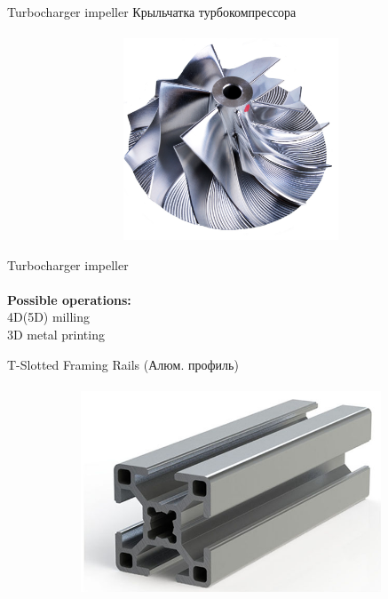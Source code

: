 \documentclass[aspectratio=169]{beamer}
\begin{document}
\begin{frame}[c]{Turbocharger impeller Крыльчатка турбокомпрессора}
\framesubtitle{}
    \vspace{-0.6cm}
    \begin{figure}[H]
        \centering\includegraphics[height=6cm,width=1\textwidth,keepaspectratio]{tourbin.png}
        \label{fig:tourbin.png}
    \end{figure}
\end{frame} 

\begin{frame}[c]{Turbocharger impeller}
    \framesubtitle{}
        \LARGE \centering
        \textbf{Possible operations: } \\ 
        4D(5D) milling\\
        3D metal printing
    \end{frame}

\begin{frame}[c]{T-Slotted Framing Rails (Алюм. профиль)}
\framesubtitle{}
    \vspace{-0.6cm}
    \begin{figure}[H]
        \centering\includegraphics[height=6cm,width=1\textwidth,keepaspectratio]{t_slot.png}
        \label{fig:t_slot.png}
    \end{figure}
\end{frame}
\end{document}

